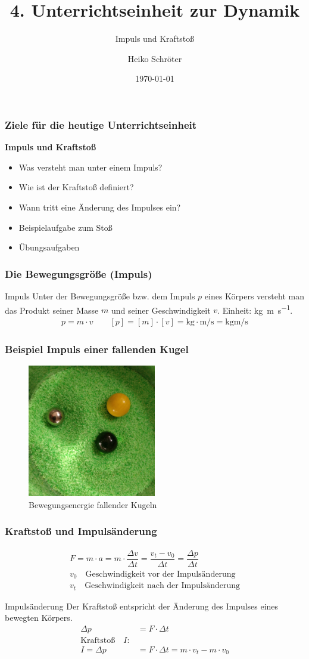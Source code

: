 \documentclass{article}
\title{4. Unterrichtseinheit zur Dynamik}
\subtitle{Impuls und Kraftstoß}
\author{Heiko Schröter}
\date{\today}
\begin{document}
\frame{\titlepage}

\frame
{
  \frametitle{Ziele für die heutige Unterrichtseinheit}
  \textbf{Impuls und Kraftstoß}
  \begin{itemize}
	\item Was versteht man unter einem Impuls?
	\item Wie ist der Kraftstoß definiert?
	\item Wann tritt eine Änderung des Impulses ein?
	\item Beispielaufgabe zum Stoß
	\item Übungsaufgaben
  \end{itemize}
}

\frame
{
  \frametitle{Die Bewegungsgröße (Impuls)}
\begin{block}{Impuls}
Unter der Bewegungsgröße bzw. dem Impuls $p$ eines Körpers versteht man das Produkt seiner Masse $m$ und seiner Geschwindigkeit $v$. Einheit: \si{\kilogram\meter\per\second}.
\begin{align*}
p=m\cdot v\quad\quad [p]=[m]\cdot[v]=\si{\kilogram}\cdot\si{\meter\per\second}=\si{\kilogram\meter\per\second}
\end{align*}
\end{block}
}

\frame
{
  \frametitle{Beispiel Impuls einer fallenden Kugel}
      \begin{figure}
	  \includegraphics[width=0.5\textwidth]{Impuls}
	  \vspace{-3mm}
	  \caption{Bewegungsenergie fallender Kugeln}
   \end{figure}
}

\frame
{
  \frametitle{Kraftstoß und Impulsänderung}
\begin{align*}
F=m\cdot a=m\cdot\dfrac{\Delta v}{\Delta t}=\dfrac{v_t-v_0}{\Delta t}=\dfrac{\Delta p}{\Delta t}\\
v_0\quad\text{Geschwindigkeit vor der Impulsänderung}\\
v_t\quad\text{Geschwindigkeit nach der Impulsänderung}
\end{align*}
\begin{block}{Impulsänderung}
Der Kraftstoß entspricht der Änderung des Impulses eines bewegten Körpers.
\begin{align*}
\Delta p&=F\cdot \Delta t\\
\text{Kraftstoß}\quad I:\\
I=\Delta p&=F\cdot \Delta t=m\cdot v_t - m\cdot v_0
\end{align*}
\end{block}
}
\end{document}

